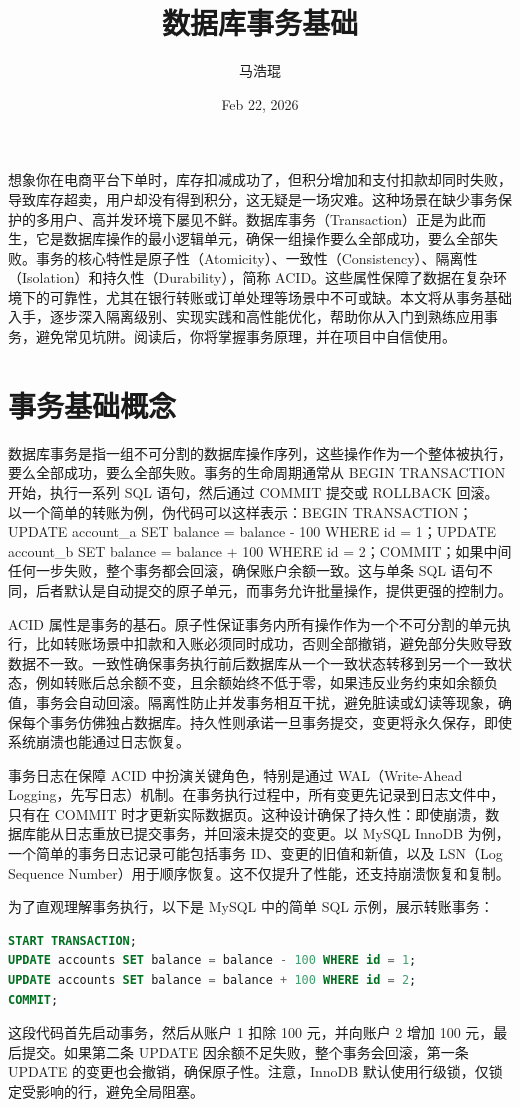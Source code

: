 \title{数据库事务基础}
\author{马浩琨}
\date{Feb 22, 2026}
\maketitle
想象你在电商平台下单时，库存扣减成功了，但积分增加和支付扣款却同时失败，导致库存超卖，用户却没有得到积分，这无疑是一场灾难。这种场景在缺少事务保护的多用户、高并发环境下屡见不鲜。数据库事务（Transaction）正是为此而生，它是数据库操作的最小逻辑单元，确保一组操作要么全部成功，要么全部失败。事务的核心特性是原子性（Atomicity）、一致性（Consistency）、隔离性（Isolation）和持久性（Durability），简称 ACID。这些属性保障了数据在复杂环境下的可靠性，尤其在银行转账或订单处理等场景中不可或缺。本文将从事务基础入手，逐步深入隔离级别、实现实践和高性能优化，帮助你从入门到熟练应用事务，避免常见坑阱。阅读后，你将掌握事务原理，并在项目中自信使用。\par
\chapter{事务基础概念}
数据库事务是指一组不可分割的数据库操作序列，这些操作作为一个整体被执行，要么全部成功，要么全部失败。事务的生命周期通常从 BEGIN TRANSACTION 开始，执行一系列 SQL 语句，然后通过 COMMIT 提交或 ROLLBACK 回滚。以一个简单的转账为例，伪代码可以这样表示：BEGIN TRANSACTION；UPDATE account\_{}a SET balance = balance - 100 WHERE id = 1；UPDATE account\_{}b SET balance = balance + 100 WHERE id = 2；COMMIT；如果中间任何一步失败，整个事务都会回滚，确保账户余额一致。这与单条 SQL 语句不同，后者默认是自动提交的原子单元，而事务允许批量操作，提供更强的控制力。\par
ACID 属性是事务的基石。原子性保证事务内所有操作作为一个不可分割的单元执行，比如转账场景中扣款和入账必须同时成功，否则全部撤销，避免部分失败导致数据不一致。一致性确保事务执行前后数据库从一个一致状态转移到另一个一致状态，例如转账后总余额不变，且余额始终不低于零，如果违反业务约束如余额负值，事务会自动回滚。隔离性防止并发事务相互干扰，避免脏读或幻读等现象，确保每个事务仿佛独占数据库。持久性则承诺一旦事务提交，变更将永久保存，即使系统崩溃也能通过日志恢复。\par
事务日志在保障 ACID 中扮演关键角色，特别是通过 WAL（Write-Ahead Logging，先写日志）机制。在事务执行过程中，所有变更先记录到日志文件中，只有在 COMMIT 时才更新实际数据页。这种设计确保了持久性：即使崩溃，数据库能从日志重放已提交事务，并回滚未提交的变更。以 MySQL InnoDB 为例，一个简单的事务日志记录可能包括事务 ID、变更的旧值和新值，以及 LSN（Log Sequence Number）用于顺序恢复。这不仅提升了性能，还支持崩溃恢复和复制。\par
为了直观理解事务执行，以下是 MySQL 中的简单 SQL 示例，展示转账事务：\par
\begin{lstlisting}[language=sql]
START TRANSACTION;
UPDATE accounts SET balance = balance - 100 WHERE id = 1;
UPDATE accounts SET balance = balance + 100 WHERE id = 2;
COMMIT;
\end{lstlisting}
这段代码首先启动事务，然后从账户 1 扣除 100 元，并向账户 2 增加 100 元，最后提交。如果第二条 UPDATE 因余额不足失败，整个事务会回滚，第一条 UPDATE 的变更也会撤销，确保原子性。注意，InnoDB 默认使用行级锁，仅锁定受影响的行，避免全局阻塞。\par
